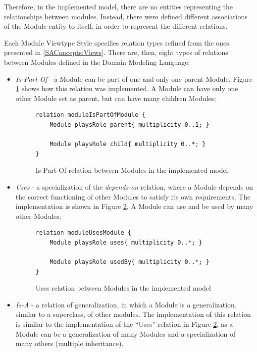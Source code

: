 \documentclass{llncs}
\begin{document}
Therefore, in the implemented model, there are no entities representing the relationships between modules. Instead, there were defined different associations of the Module entity to itself, in order to represent the different relations.

Each Module Viewtype Style specifies relation types refined from the ones presented in \ref{SAConcepts:Views}. There are, then, eight types of relations between Modules\cite{clements2003documenting} defined in the Domain Modeling Language:
\begin{itemize}
\item \textit{Is-Part-Of} - a Module can be part of one and only one parent Module. Figure \ref{figure:modelIsPartOfRelation} shows how this relation was implemented. A Module can have only one other Module set as parent, but can have many children Modules;
\begin{figure}
\centering
\lstset{style=customjava}
\begin{lstlisting}
relation moduleIsPartOfModule {
	Module playsRole parent{ multiplicity 0..1; }
	
	Module playsRole child{ multiplicity 0..*; }
}
\end{lstlisting}
\caption{Is-Part-Of relation between Modules in the implemented model}
\label{figure:modelIsPartOfRelation}
\end{figure}

\item \textit{Uses} - a specialization of the \textit{depends-on} relation, where a Module depends on the correct functioning of other Modules to satisfy its own requirements. The implementation is shown in Figure \ref{figure:modelUsesRelation}. A Module can use and be used by many other Modules;
\begin{figure}
\lstset{style=customjava}
\begin{lstlisting}
relation moduleUsesModule {
	Module playsRole uses{ multiplicity 0..*; }
	
	Module playsRole usedBy{ multiplicity 0..*; }
}
\end{lstlisting}
\caption{Uses relation between Modules in the implemented model}
\label{figure:modelUsesRelation}
\end{figure}

\item \textit{Is-A} - a relation of generalization, in which a Module is a generalization, similar to a superclass, of other modules. The implementation of this relation is similar to the implementation of the ``Uses'' relation in Figure \ref{figure:modelUsesRelation}, as a Module can be a generalization of many Modules and a specialization of many others (multiple inheritance).


\end{itemize}
\end{document}

